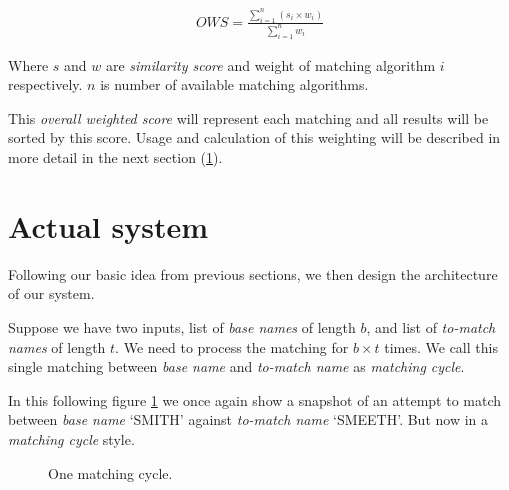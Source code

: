 \begin{equation}
  \begin{gathered}
    OWS = \frac{
      \displaystyle\sum_{i=1}^{n} (s_i \times w_i)
    }{
      \displaystyle\sum_{i=1}^{n} w_i
    }
  \end{gathered}
  \label{eq:ows}
\end{equation}

Where $s$ and $w$ are \emph{similarity score} and weight of
matching algorithm $i$ respectively. $n$ is number of available
matching algorithms.

This \emph{overall weighted score} will represent
each matching and all results will be sorted by this score.
Usage and calculation of this weighting will be described in more detail
in the next section (\ref{sec:actualsys}).

\section{Actual system}
\label{sec:actualsys}

Following our basic idea from previous sections, we then design the
architecture of our system.

Suppose we have two inputs, list of \emph{base names} of length $b$,
and list of \emph{to-match names} of length $t$. We need to
process the matching for $b \times t$ times. We call this single
matching between \emph{base name} and \emph{to-match name}
as \emph{matching cycle}.

In this following figure \ref{fig:overall} we once again show a snapshot
of an attempt to match between \emph{base name} `SMITH'
against \emph{to-match name} `SMEETH'. But now in a \emph{matching cycle} style.

\begin{figure}[H]
\centering
\captionsetup{justification=centering}
\caption{One matching cycle.}
\label{fig:overall}
\end{figure}

